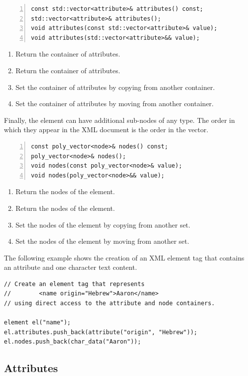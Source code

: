 \documentclass[10pt,a4paper,openany]{mudbook}
\newenvironment{enumeratedef}
  {\begin{enumerate}[topsep=0.5em,itemsep=0em,parsep=0em,font=\small]
     \small}
  {\end{enumerate}}
\begin{document}
\begin{lstlisting}[style=definition,numbers=left]
const std::vector<attribute>& attributes() const;
std::vector<attribute>& attributes();
void attributes(const std::vector<attribute>& value);
void attributes(std::vector<attribute>&& value);
\end{lstlisting}
\begin{enumeratedef}
  \item Return the container of attributes.
  \item Return the container of attributes.
  \item Set the container of attributes by copying from another container.
  \item Set the container of attributes by moving from another container.
\end{enumeratedef}

Finally, the element can have additional sub-nodes of any type. The order
in which they appear in the XML document is the order in the vector.

\begin{lstlisting}[style=definition,numbers=left]
const poly_vector<node>& nodes() const;
poly_vector<node>& nodes();
void nodes(const poly_vector<node>& value);
void nodes(poly_vector<node>&& value);
\end{lstlisting}
\begin{enumeratedef}
  \item Return the nodes of the element.
  \item Return the nodes of the element.
  \item Set the nodes of the element by copying from another set.
  \item Set the nodes of the element by moving from another set.
\end{enumeratedef}

The following example shows the creation of an XML element tag that
contains an attribute and one character text content.

\begin{lstlisting}[style=snippet]
// Create an element tag that represents
//        <name origin="Hebrew">Aaron</name>
// using direct access to the attribute and node containers.

element el("name");
el.attributes.push_back(attribute("origin", "Hebrew"));
el.nodes.push_back(char_data("Aaron"));
\end{lstlisting}

\subsection{Attributes}
\end{document}
